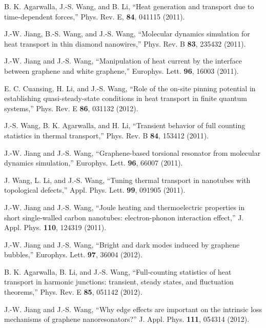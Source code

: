 \itm B. K. Agarwalla, J.-S. Wang, and B. Li, ``Heat generation and 
transport due to time-dependent forces,'' 
Phys. Rev. E, {\bf 84}, 041115 (2011). 

\itm J.-W. Jiang, B.-S. Wang, and J.-S. Wang, 
``Molecular dynamics simulation for heat transport in thin diamond 
nanowires,'' Phys. Rev. B {\bf 83}, 235432 (2011).

\itm J.-W. Jiang and J.-S. Wang, ``Manipulation of heat current by the 
interface between graphene and white graphene,'' 
Europhys. Lett. {\bf 96}, 16003 (2011). 

\itm E. C. Cuansing, H. Li, and J.-S. Wang, ``Role of the on-site pinning
potential in establishing quasi-steady-state conditions in heat transport 
in finite quantum systems,'' Phys. Rev. E {\bf 86}, 031132 (2012). 

\itm J.-S. Wang, B. K. Agarwalla, and H. Li, ``Transient behavior of full 
counting statistics in thermal transport,'' 
Phys. Rev. B {\bf 84}, 153412 (2011). 

\itm J.-W. Jiang and J.-S. Wang, ``Graphene-based torsional resonator from molecular dynamics simulation,'' Europhys. Lett. {\bf 96}, 66007 (2011). 

\itm J. Wang, L. Li, and J.-S. Wang, ``Tuning thermal transport in nanotubes 
with topological defects,'' Appl. Phys. Lett. {\bf 99}, 091905 (2011).


\itm J.-W. Jiang and J.-S. Wang, ``Joule heating and thermoelectric properties in 
short single-walled carbon nanotubes: electron-phonon interaction effect,'' 
J. Appl. Phys. {\bf 110}, 124319 (2011).


\itm J.-W. Jiang and J.-S. Wang, ``Bright and dark modes induced by graphene 
bubbles,'' Europhys. Lett. {\bf 97}, 36004 (2012). 

\itm B. K. Agarwalla, B. Li, and J.-S. Wang, 
``Full-counting statistics of heat transport in harmonic junctions: 
transient, steady states, and fluctuation theorems,'' 
Phys. Rev. E {\bf 85}, 051142 (2012). 

\itm J.-W. Jiang and J.-S. Wang, ``Why edge effects are important on the 
intrinsic loss mechanisms of graphene nanoresonators?'' J. Appl. Phys.
{\bf 111}, 054314 (2012). 

